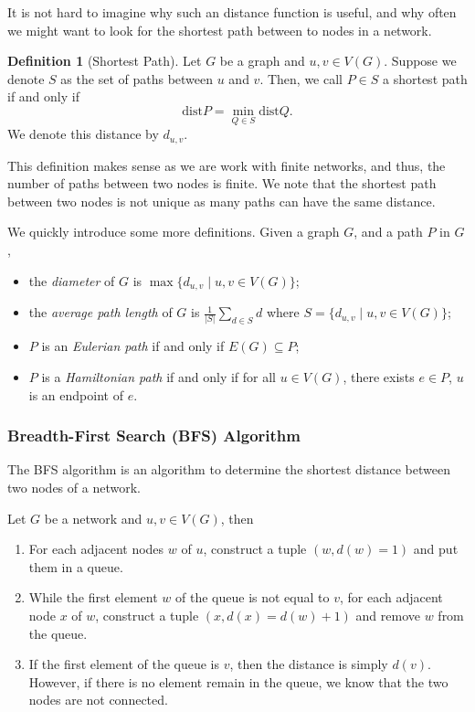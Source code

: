 \documentclass[
]{article}
\theoremstyle{definition}
\newtheorem{definition}{Definition}[section]
\begin{document}
It is not hard to imagine why such an distance function is useful, and
why often we might want to look for the shortest path between to nodes
in a network.

\begin{definition}[Shortest Path]
  Let \(G\) be a graph and \(u, v \in V(G)\). Suppose we denote \(S\) as the set 
  of paths between \(u\) and \(v\). Then, we call \(P \in S\) a shortest path 
  if and only if 
  \[ \text{dist} P = \min_{Q \in S} \text{dist} Q.\]
  We denote this distance by \(d_{u, v}\).
\end{definition}

This definition makes sense as we are work with finite networks, and
thus, the number of paths between two nodes is finite. We note that the
shortest path between two nodes is not unique as many paths can have the
same distance.

We quickly introduce some more definitions. Given a graph \(G\), and a
path \(P\) in \(G\),

\begin{itemize}
  \item the \textit{diameter} of \(G\) is \(\max \{d_{u, v} \mid u, v \in V(G)\}\);
  \item the \textit{average path length} of \(G\) is 
    \(\frac{1}{\left| S \right|} \sum_{d \in S} d\) 
    where \(S = \{d_{u, v} \mid u, v \in V(G)\}\);
  \item \(P\) is an \textit{Eulerian path} if and only if \(E(G) \subseteq P\);
  \item \(P\) is a \textit{Hamiltonian path} if and only if for all 
    \(u \in V(G)\), there exists \(e \in P\), \(u\) is an endpoint of \(e\).
\end{itemize}

\hypertarget{breadth-first-search-bfs-algorithm}{%
\subsubsection{Breadth-First Search (BFS)
Algorithm}\label{breadth-first-search-bfs-algorithm}}

The BFS algorithm is an algorithm to determine the shortest distance
between two nodes of a network.

Let \(G\) be a network and \(u, v \in V(G)\), then

\begin{enumerate}
  \item For each adjacent nodes \(w\) of \(u\), construct a tuple 
    \((w, d(w) = 1)\) and put them in a queue.
  \item While the first element \(w\) of the queue is not equal to \(v\), 
    for each adjacent node \(x\) of \(w\), construct a tuple 
    \((x, d(x) = d(w) + 1)\) and remove \(w\) from the queue.
  \item If the first element of the queue is \(v\), then the distance is simply 
    \(d(v)\). However, if there is no element remain in the queue, we know that 
    the two nodes are not connected.
\end{enumerate}
\end{document}
